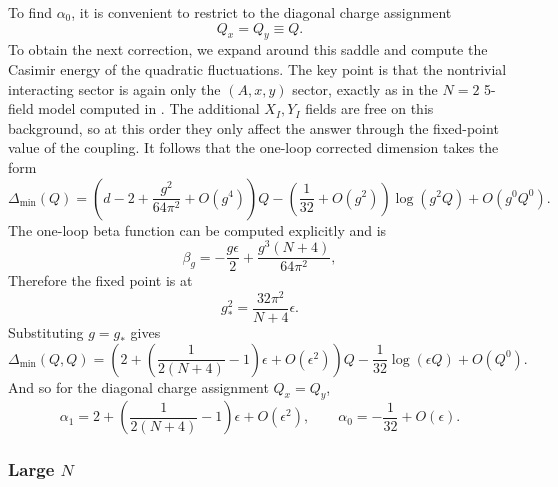 \documentclass[a4paper,11pt]{article}
\newcommand\Dm{\Delta_{\min}}
\begin{document}
To find $\alpha_0$, it is convenient to restrict to the diagonal charge assignment
\begin{equation}
  Q_x=Q_y\equiv Q.
\end{equation}
To obtain the next correction, we expand around this saddle and compute the Casimir energy of the quadratic fluctuations. The key point is that the nontrivial interacting sector is again only the $(A,x,y)$ sector, exactly as in the $N=2$ 5-field model computed in \cite{Cuomo:2024fuy}. The additional $X_I,Y_I$ fields are free on this background, so at this order they only affect the answer through the fixed-point value of the coupling. It follows that the one-loop corrected dimension takes the form
\begin{equation}
  \Dm(Q)=\left(d-2+\frac{g^2}{64\pi^2}+O(g^4)\right)Q-\left(\frac{1}{32}+O(g^2)\right)\log(g^2Q)+O(g^0Q^0).
\end{equation}
The one-loop beta function can be computed explicitly and is
\begin{equation}
  \beta_g=-\frac{g\epsilon}{2}+\frac{g^3(N+4)}{64\pi^2},
\end{equation}
Therefore the fixed point is at
\begin{equation}
  g_*^2=\frac{32\pi^2}{N+4}\epsilon.
\end{equation}
Substituting $g=g_*$ gives
\begin{equation}
  \Dm(Q,Q) =\left(2+\left(\frac{1}{2(N+4)}-1\right)\epsilon +O(\epsilon^2)\right)Q -\frac{1}{32}\log(\epsilon Q)+O(Q^0).
\end{equation}
And so for the diagonal charge assignment $Q_x=Q_y$,
\begin{equation}
  \alpha_1 = 2+ \left(\frac{1}{2(N+4)}-1\right)\epsilon +O(\epsilon^2), \qquad \alpha_0 = -\frac{1}{32}+O(\epsilon).
\end{equation}

\subsubsection{Large $N$}
\end{document}
